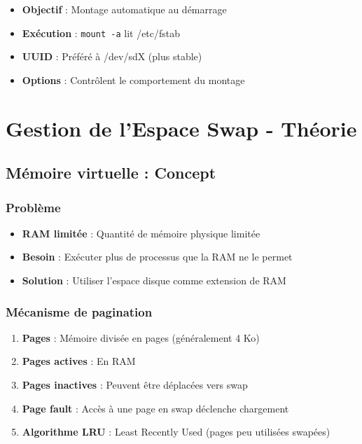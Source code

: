 \documentclass[12pt,a4paper]{article}
\begin{document}
\begin{itemize}
    \item \textbf{Objectif} : Montage automatique au démarrage
    \item \textbf{Exécution} : \texttt{mount -a} lit /etc/fstab
    \item \textbf{UUID} : Préféré à /dev/sdX (plus stable)
    \item \textbf{Options} : Contrôlent le comportement du montage
\end{itemize}


\section{Gestion de l'Espace Swap - Théorie}

\subsection{Mémoire virtuelle : Concept}

\subsubsection{Problème}

\begin{itemize}
    \item \textbf{RAM limitée} : Quantité de mémoire physique limitée
    \item \textbf{Besoin} : Exécuter plus de processus que la RAM ne le permet
    \item \textbf{Solution} : Utiliser l'espace disque comme extension de RAM
\end{itemize}

\subsubsection{Mécanisme de pagination}

\begin{enumerate}
    \item \textbf{Pages} : Mémoire divisée en pages (généralement 4 Ko)
    \item \textbf{Pages actives} : En RAM
    \item \textbf{Pages inactives} : Peuvent être déplacées vers swap
    \item \textbf{Page fault} : Accès à une page en swap déclenche chargement
    \item \textbf{Algorithme LRU} : Least Recently Used (pages peu utilisées swapées)
\end{enumerate}
\end{document}
